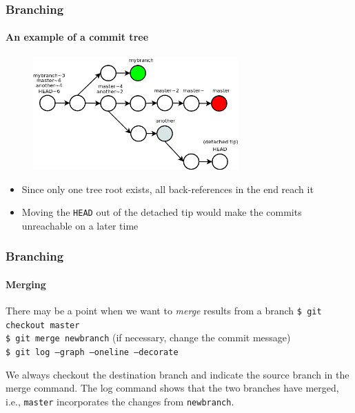 \begin{frame}
\frametitle{Branching}
\framesubtitle{An example of a commit tree}

\begin{figure}
\includegraphics[width=0.7\textwidth]{lecture03/img/branches.png}
\end{figure}

\begin{itemize}
\item Since only one tree root exists, all back-references in the end reach it
\item Moving the \texttt{HEAD} out of the detached tip would make the commits unreachable on a later time
\end{itemize}

\end{frame}

\begin{frame}
\frametitle{Branching}
\framesubtitle{Merging}

\begin{block}{There may be a point when we want to {\em merge} results from a branch}
\texttt{\$ git checkout master} \\
\texttt{\$ git merge newbranch}  (if necessary, change the commit message)\\
\texttt{\$ git log ---graph ---oneline ---decorate}
\medskip

We always checkout the destination branch and indicate the source branch in the merge command. The log command shows that the two branches have merged, i.e., \texttt{master} incorporates the changes from \texttt{newbranch}.
\end{block}

\end{frame}

